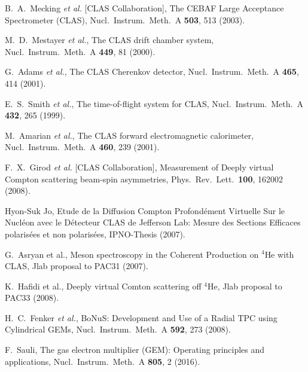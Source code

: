 \documentclass[preprint,5p]{elsarticle}
\begin{document}
\begin{thebibliography}{99}

   B.~A.~Mecking {\it et al.} [CLAS Collaboration],
  The CEBAF Large Acceptance Spectrometer (CLAS),
  Nucl.\ Instrum.\ Meth.\ A {\bf 503}, 513 (2003).

   M.~D.~Mestayer {\it et al.},
  The CLAS drift chamber system,
  Nucl.\ Instrum.\ Meth.\ A {\bf 449}, 81 (2000).

   G.~Adams {\it et al.},
  The CLAS Cherenkov detector,
  Nucl.\ Instrum.\ Meth.\ A {\bf 465}, 414 (2001).

   E.~S.~Smith {\it et al.},
  The time-of-flight system for CLAS,
  Nucl.\ Instrum.\ Meth.\ A {\bf 432}, 265 (1999).

   M.~Amarian {\it et al.},
  The CLAS forward electromagnetic calorimeter,
  Nucl.\ Instrum.\ Meth.\ A {\bf 460}, 239 (2001).

   F.~X.~Girod {\it et al.} [CLAS Collaboration],
  Measurement of Deeply virtual Compton scattering beam-spin asymmetries,
  Phys.\ Rev.\ Lett.\  {\bf 100}, 162002 (2008).

   Hyon-Suk Jo, Etude de la Diffusion Compton Profond{\'e}ment Virtuelle Sur le 
   Nucl{\'e}on avec le D{\'e}tecteur CLAS de Jefferson Lab: Mesure des Sections 
   Efficaces polaris{\'e}es et non polaris{\'e}es, IPNO-Thesis (2007).

   G.~Asryan et al., Meson spectroscopy in the Coherent Production on $^{4}$He 
   with CLAS, Jlab proposal to PAC31 (2007).

   K.~Hafidi et al., Deeply virtual Comton scattering off $^{4}$He, Jlab 
   proposal to PAC33 (2008).

   H.~C.~Fenker {\it et al.},
  BoNuS: Development and Use of a Radial TPC using Cylindrical GEMs,
  Nucl.\ Instrum.\ Meth.\ A {\bf 592}, 273 (2008).

   F.~Sauli,
  The gas electron multiplier (GEM): Operating principles and applications,
  Nucl.\ Instrum.\ Meth.\ A {\bf 805}, 2 (2016).


\end{thebibliography}
\end{document}
